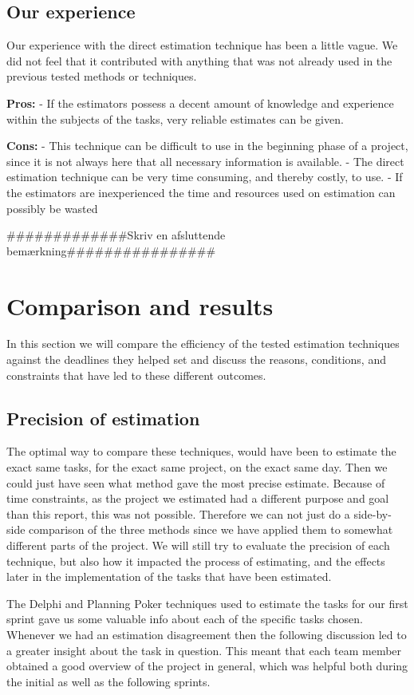\subsection{Our experience}
Our experience with the direct estimation technique has been a little vague. We did not feel that it contributed with anything that was not already used in the previous tested methods or techniques. 

\textbf{Pros:}
- If the estimators possess a decent amount of knowledge and experience within the subjects of the tasks, very reliable estimates can be given. 

\textbf{Cons:}
- This technique can be difficult to use in the beginning phase of a project, since it is not always here that all necessary information is available.
- The direct estimation technique can be very time consuming, and thereby costly, to use.
- If the estimators are inexperienced the time and resources used on estimation can possibly be wasted

#############Skriv en afsluttende bemærkning################


\section{Comparison and results}

In this section we will compare the efficiency of the tested estimation techniques against the deadlines they helped set and discuss the reasons, conditions, and constraints that have led to these different outcomes.

\subsection{Precision of estimation}
The optimal way to compare these techniques, would have been to estimate the exact same tasks, for the exact same project, on the exact same day. Then we could just have seen what method gave the most precise estimate. Because of time constraints, as the project we estimated had a different purpose and goal than this report, this was not possible. Therefore we can not just do a side-by-side comparison of the three methods since we have applied them to somewhat different parts of the project. We will still try to evaluate the precision of each technique, but also how it impacted the process of estimating, and the effects later in the implementation of the tasks that have been estimated. \


The Delphi and Planning Poker techniques used to estimate the tasks for our first sprint gave us some valuable info about each of the specific tasks chosen. Whenever we had an estimation disagreement then the following discussion led to a greater insight about the task in question. This meant that each team member obtained a good overview of the project in general, which was helpful both during the initial as well as the following sprints.

